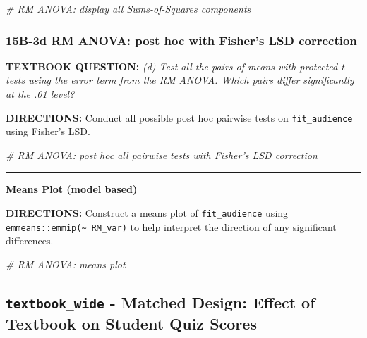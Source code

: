 \documentclass[]{article}
\newenvironment{Shaded}{\begin{snugshade}}{\end{snugshade}}
\newcommand{\CommentTok}[1]{\textcolor[rgb]{0.56,0.35,0.01}{\textit{#1}}}
\begin{document}
\begin{Shaded}
\begin{Highlighting}[]
\CommentTok{# RM ANOVA: display all Sums-of-Squares components}
\end{Highlighting}
\end{Shaded}

\clearpage

\subsubsection{15B-3d RM ANOVA: post hoc with Fisher's LSD
correction}\label{b-3d-rm-anova-post-hoc-with-fishers-lsd-correction}

\textbf{TEXTBOOK QUESTION:} \emph{(d) Test all the pairs of means with
protected t tests using the error term from the RM ANOVA. Which pairs
differ significantly at the .01 level?}

\textbf{DIRECTIONS:} Conduct all possible post hoc pairwise tests on
\texttt{fit\_audience} using Fisher's LSD.

\begin{Shaded}
\begin{Highlighting}[]
\CommentTok{# RM ANOVA: post hoc all pairwise tests with Fisher's LSD correction}
\end{Highlighting}
\end{Shaded}

\begin{center}\rule{0.5\linewidth}{\linethickness}\end{center}

\textbf{Means Plot (model based)}

\textbf{DIRECTIONS:} Construct a means plot of \texttt{fit\_audience}
using \texttt{emmeans::emmip(\textasciitilde{}\ RM\_var)} to help
interpret the direction of any significant differences.

\begin{Shaded}
\begin{Highlighting}[]
\CommentTok{# RM ANOVA: means plot}
\end{Highlighting}
\end{Shaded}

\clearpage

\subsection{\texorpdfstring{\texttt{textbook\_wide} - Matched Design:
Effect of Textbook on Student Quiz
Scores}{textbook\_wide - Matched Design: Effect of Textbook on Student Quiz Scores}}\label{textbook_wide---matched-design-effect-of-textbook-on-student-quiz-scores}
\end{document}
